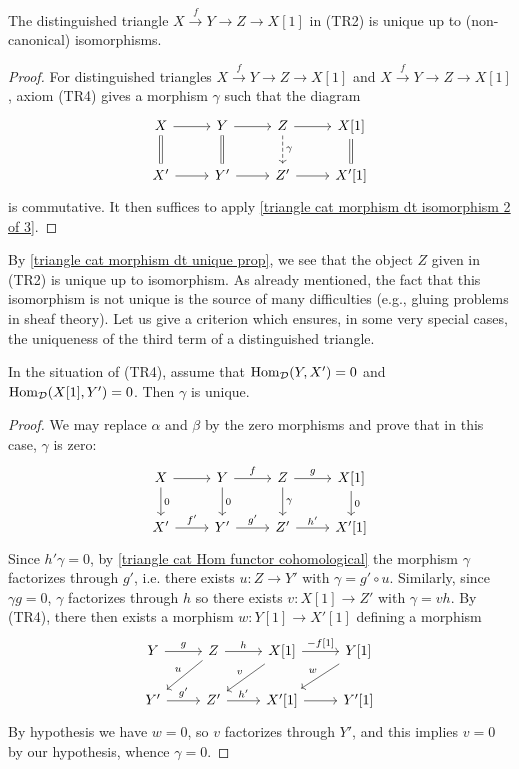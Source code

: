 \begin{corollary}\label{triangle cat morphism dt unique prop}
The distinguished triangle $X\stackrel{f}{\to} Y\to Z\to X[1]$ in (TR2) is unique up to (non-canonical) isomorphisms. 
\end{corollary}
\begin{proof}
For distinguished triangles $X\stackrel{f}{\to} Y\to Z\to X[1]$ and $X\stackrel{f}{\to} Y\to Z\to X[1]$, axiom (TR4) gives a morphism $\gamma$ such that the diagram
\[\begin{tikzcd}
X\ar[r]\ar[d,equal]&Y\ar[r]\ar[d,equal]&Z\ar[r]\ar[d,dashed,"\gamma"]&X[1]\ar[d,equal]\\
X'\ar[r]&Y'\ar[r]&Z'\ar[r]&X'[1]
\end{tikzcd}\]
is commutative. It then suffices to apply \cref{triangle cat morphism dt isomorphism 2 of 3}. 
\end{proof}

By \cref{triangle cat morphism dt unique prop}, we see that the object $Z$ given in (TR2) is unique up to isomorphism. As already mentioned, the fact that this isomorphism is not unique is the source of many difficulties (e.g., gluing problems in sheaf theory). Let us give a criterion which ensures, in some very special cases, the uniqueness of the third term of a distinguished triangle.

\begin{proposition}\label{triangle cat TR4 unique morphism if}
In the situation of (TR4), assume that $\mathrm{Hom}_\mathcal{D}(Y,X')=0$ and $\mathrm{Hom}_\mathcal{D}(X[1],Y')=0$. Then $\gamma$ is unique.
\end{proposition}
\begin{proof}
We may replace $\alpha$ and $\beta$ by the zero morphisms and prove that in this case, $\gamma$ is zero:
\[\begin{tikzcd}
X\ar[r]\ar[d,"0"]&Y\ar[r,"f"]\ar[d,"0"]&Z\ar[r,"g"]\ar[d,"\gamma"]&X[1]\ar[d,"0"]\\
X'\ar[r,"f'"]&Y'\ar[r,"g'"]&Z'\ar[r,"h'"]&X'[1]
\end{tikzcd}\]
Since $h'\gamma=0$, by \cref{triangle cat Hom functor cohomological} the morphism $\gamma$ factorizes through $g'$, i.e. there exists $u:Z\to Y'$ with $\gamma=g'\circ u$. Similarly, since $\gamma g=0$, $\gamma$ factorizes through $h$ so there exists $v:X[1]\to Z'$ with $\gamma=vh$. By (TR4), there then exists a morphism $w:Y[1]\to X'[1]$ defining a morphism
\[\begin{tikzcd}
Y\ar[r,"g"]&Z\ar[r,"h"]\ar[ld,swap,"u"]&X[1]\ar[r,"{-f[1]}"]\ar[ld,swap,"v"]&Y[1]\ar[ld,swap,"w"]\\
Y'\ar[r,"g'"]&Z'\ar[r,"h'"]&X'[1]\ar[r]&Y'[1]
\end{tikzcd}\]
By hypothesis we have $w=0$, so $v$ factorizes through $Y'$, and this implies $v=0$ by our hypothesis, whence $\gamma=0$.
\end{proof}

